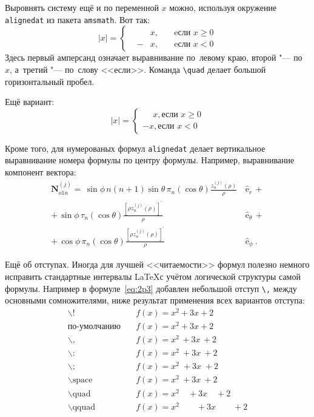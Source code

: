 Выровнять систему ещё и по переменной $ x $ можно, используя окружение \verb|alignedat| из пакета \verb|amsmath|. Вот так: 
\[
    |x| = \left\{
    \begin{alignedat}{2}
        &&x, \quad &\text{eсли } x\geqslant 0 \\
        &-&x, \quad & \text{eсли } x<0
    \end{alignedat}
    \right.
\]
Здесь первый амперсанд  означает выравнивание по~левому краю, второй "--- по~$ x $, а~третий "--- по~слову <<если>>. Команда \verb|\quad| делает большой горизонтальный пробел. 

Ещё вариант:
\[
    |x|=
    \begin{cases}
    \phantom{-}x, \text{если } x \geqslant 0 \\
    -x, \text{если } x<0
    \end{cases}
\]

Кроме того, для  нумерованых формул \verb|alignedat|  делает вертикальное
выравнивание номера формулы по центру формулы. Например,  выравнивание компонент вектора:
\begin{equation}
 \label{eq:2p3}
 \begin{alignedat}{2}
{\mathbf{N}}_{o1n}^{(j)} = \,{\sin} \phi\,n\!\left(n+1\right)
         {\sin}\theta\,
         \pi_n\!\left({\cos} \theta\right)
         \frac{
               z_n^{(j)}\!\left( \rho \right)
              }{\rho}\,
           &{\boldsymbol{\hat{\mathrm e}}}_{r}\,+   \\
+\,
{\sin} \phi\,
         \tau_n\!\left({\cos} \theta\right)
         \frac{
            \left[\rho z_n^{(j)}\!\left( \rho \right)\right]^{\prime}
              }{\rho}\,
            &{\boldsymbol{\hat{\mathrm e}}}_{\theta}\,+   \\
+\,
{\cos} \phi\,
         \pi_n\!\left({\cos} \theta\right)
         \frac{
            \left[\rho z_n^{(j)}\!\left( \rho \right)\right]^{\prime}
              }{\rho}\,
            &{\boldsymbol{\hat{\mathrm e}}}_{\phi}\:.
\end{alignedat}
\end{equation}

Ещё об отступах. Иногда для лучшей <<читаемости>> формул полезно
немного исправить стандартные интервалы \LaTeX с учётом логической
структуры самой формулы. Например в формуле~\ref{eq:2p3} добавлен
небольшой отступ \verb+\,+ между основными сомножителями, ниже
результат применения всех вариантов отступа:
\begin{align*}
\backslash! &\quad f(x) = x^2\! +3x\! +2 \\
  \mbox{по-умолчанию} &\quad f(x) = x^2+3x+2 \\
\backslash, &\quad f(x) = x^2\, +3x\, +2 \\
\backslash{:} &\quad f(x) = x^2\: +3x\: +2 \\
\backslash; &\quad f(x) = x^2\; +3x\; +2 \\
\backslash \mbox{space} &\quad f(x) = x^2\ +3x\ +2 \\
\backslash \mbox{quad} &\quad f(x) = x^2\quad +3x\quad +2 \\
\backslash \mbox{qquad} &\quad f(x) = x^2\qquad +3x\qquad +2
\end{align*}


